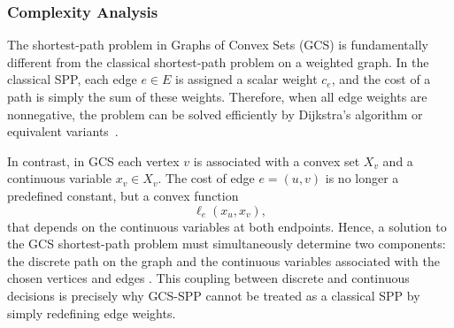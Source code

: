 \subsubsection{Complexity Analysis}
\label{subsubsec:gcs_complexity}

The shortest-path problem in Graphs of Convex Sets (GCS) is fundamentally
different from the classical shortest-path problem on a weighted graph. In the
classical SPP, each edge $e \in E$ is assigned a scalar weight $c_e$, and the
cost of a path is simply the sum of these weights. Therefore, when all edge
weights are nonnegative, the problem can be solved efficiently by Dijkstra's
algorithm or equivalent variants~\cite{AhujaMagnantiOrlin1993}.

In contrast, in GCS each vertex $v$ is associated with a convex set $X_v$ and a
continuous variable $x_v \in X_v$. The cost of edge $e=(u,v)$ is no longer a
predefined constant, but a convex function
\[
  \ell_e(x_u,x_v),
\]
that depends on the continuous variables at both endpoints. Hence, a solution to
the GCS shortest-path problem must simultaneously determine two components: the
discrete path on the graph and the continuous variables associated with the
chosen vertices and edges \cite{MarcucciEtAl2023GCS}. This coupling between
discrete and continuous decisions is precisely why GCS-SPP cannot be treated as a
classical SPP by simply redefining edge weights.



